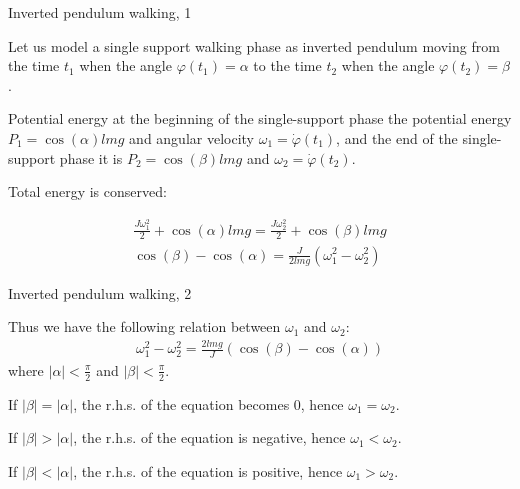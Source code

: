 \documentclass{beamer}
\begin{document}
\begin{frame}{Inverted pendulum walking, 1}
	\begin{flushleft}
		
		Let us model a single support walking phase as inverted pendulum moving from the time $t_1$ when the angle $\varphi(t_1) = \alpha$ to the time $t_2$ when the angle $\varphi(t_2) = \beta$.
		
		\bigskip
		
		Potential energy at the beginning of the single-support phase the potential energy $P_1 = \cos(\alpha) lmg$ and angular velocity $\omega_1 = \dot \varphi(t_1)$, and the end of the single-support phase it is $P_2 = \cos(\beta) lmg$ and $\omega_2 = \dot \varphi(t_2)$.
		
		\bigskip
		
		Total energy is conserved:
		
		\begin{align}
			\frac{J \omega_1^2}{2} + \cos(\alpha) lmg = 
			\frac{J \omega_2^2}{2} + \cos(\beta) lmg
			\\
			\cos(\beta)  - \cos(\alpha)= 
			\frac{J }{2lmg} (\omega_1^2 - \omega_2^2)
		\end{align}
		
	\end{flushleft}
\end{frame}



\begin{frame}{Inverted pendulum walking, 2}
	\begin{flushleft}
		
		Thus we have the following relation between $\omega_1$ and $\omega_2$:
		\begin{align}
			\omega_1^2 - \omega_2^2
			=
			\frac{2lmg}{J}
			(\cos(\beta)  - \cos(\alpha))
		\end{align}
	where $|\alpha| < \frac{\pi}{2}$ and $|\beta| < \frac{\pi}{2}$.
	
		\bigskip
	
		If $|\beta| = |\alpha|$, the r.h.s. of the equation becomes 0, hence $\omega_1 = \omega_2$.
		
		\bigskip
		
		If $|\beta| > |\alpha|$, the r.h.s. of the equation is negative, hence $\omega_1 < \omega_2$.
		
		\bigskip
		
		If $|\beta| < |\alpha|$, the r.h.s. of the equation is positive, hence $\omega_1 > \omega_2$.

		
	\end{flushleft}
\end{frame}
\end{document}
